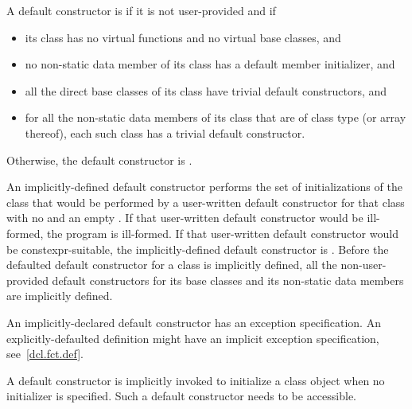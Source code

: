 \pnum
A default constructor is
if it is not user-provided and if
\begin{itemize}
\item
its class has no virtual functions and no virtual base
classes, and

\item no non-static data member of its class has
a default member initializer, and

\item
all the direct base classes of its class have trivial default constructors, and

\item
for all the non-static data members of its class that are of class
type (or array thereof), each such class has a trivial default constructor.
\end{itemize}

Otherwise, the default constructor is
.

\pnum
An implicitly-defined default constructor performs the set of
initializations of the class that would be performed by a user-written default
constructor for that class with no
 and an empty
.
If that user-written default constructor would be ill-formed,
the program is ill-formed.
If that user-written default constructor would be constexpr-suitable,
the implicitly-defined
default constructor is .
Before the defaulted default constructor for a class is
implicitly defined,
all the non-user-provided default constructors for its base classes and
its non-static data members are implicitly defined.
\begin{note}
An implicitly-declared default constructor has an
exception specification.
An explicitly-defaulted definition might have an
implicit exception specification, see~\ref{dcl.fct.def}.
\end{note}

\pnum
\begin{note}
%
A default constructor is implicitly invoked to initialize
a class object when no initializer is specified.
Such a default constructor needs to be accessible.
\end{note}

